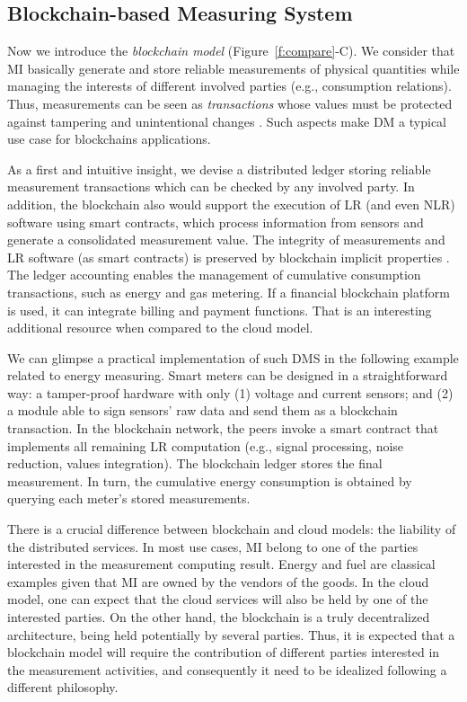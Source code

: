 \documentclass[journal]{IEEEtran}
\begin{document}
\subsection{Blockchain-based Measuring System}
\label{s:mi_blockchain}
Now we introduce the \emph{blockchain model} (Figure~\ref{f:compare}-C). 
We consider that MI basically generate and store reliable measurements of physical quantities while managing the interests of different involved parties (e.g., consumption relations). 
Thus, measurements can be seen as \emph{transactions} whose values must be protected against tampering and unintentional changes \cite{Esche2015}.
Such aspects make DM a typical use case for blockchains applications. 

As a first and intuitive insight, we devise a distributed ledger storing reliable measurement transactions which can be checked by any involved party. 
In addition, the blockchain also would support the execution of LR (and even NLR) software using smart contracts, which process information from sensors and generate a consolidated measurement value. 
The integrity of measurements and LR software (as smart contracts) is preserved by blockchain implicit properties \cite{Zheng2017}.
The ledger accounting enables the management of cumulative consumption transactions, such as energy and gas metering.
If a financial blockchain platform is used, it can integrate billing and payment functions. 
That is an interesting additional resource when compared to the cloud model.

We can glimpse a practical implementation of such DMS in the following example related to energy measuring. 
Smart meters can be designed in a straightforward way: a tamper-proof hardware with only (1) voltage and current sensors; and (2) a module able to sign sensors' raw data and send them as a blockchain transaction. 
In the blockchain network, the peers invoke a smart contract that implements all remaining LR computation (e.g., signal processing, noise reduction, values integration). 
The blockchain ledger stores the final measurement. 
In turn, the cumulative energy consumption is obtained by querying each meter's stored measurements.

There is a crucial difference between blockchain and cloud models: the liability of the distributed services. 
In most use cases, MI belong to one of the parties interested in the measurement computing result. 
Energy and fuel are classical examples given that MI are owned by the vendors of the goods.
In the cloud model, one can expect that the cloud services will also be held by one of the interested parties. 
On the other hand, the blockchain is a truly decentralized architecture, being held potentially by several parties. 
Thus, it is expected that a blockchain model will require the contribution of different parties interested in the measurement activities, and consequently it need to be idealized following a different philosophy.
\end{document}
